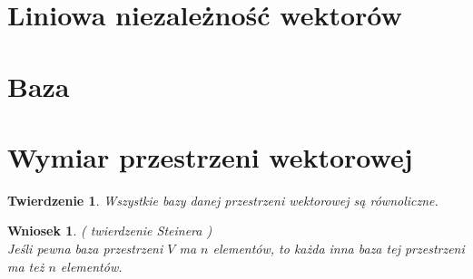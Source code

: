 \documentclass[a5paper,8pt]{article}
\newtheorem{example}{Przykład}[section]
\newtheorem{definition}{Definicja}[section]
\newtheorem{theorem}{Twierdzenie}[section]
\newtheorem*{conclusion}{Wniosek}
\begin{document}













    \section{Liniowa niezależność wektorów} %
    \label{sec:liniowa_niezależność_wektorów}


    \section{Baza} %
    \label{sec:baza}

    \newpage
    \section{Wymiar przestrzeni wektorowej} %
    \label{sec:wymiar_przestrzeni_wektorowej}

    \begin{theorem}
        Wszystkie bazy danej przestrzeni wektorowej są równoliczne.
    \end{theorem}

    \begin{conclusion}
        ( twierdzenie Steinera ) \\
        Jeśli pewna baza przestrzeni $ V $ ma $ n $ elementów, to każda inna baza tej przestrzeni ma też $ n $ elementów.
    \end{conclusion}
\end{document}
